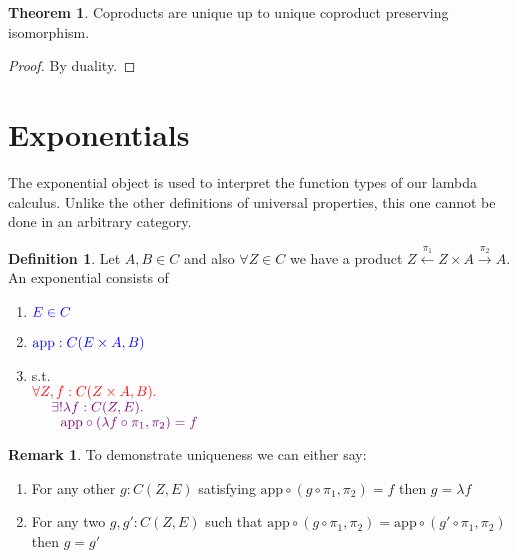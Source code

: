 \documentclass[12pt]{article}
\theoremstyle{definition}
\newtheorem{theorem}{Theorem}[section]
\newtheorem{remark}{Remark}[section]
\newtheorem{definition}{Definition}[section]
\newcommand{\app}{\mathrm{app}}
\newcommand{\purple}[1]{\textcolor{violet}{#1}}
\begin{document}
\begin{theorem}
    Coproducts are unique up to unique coproduct preserving isomorphism.
\end{theorem}
\begin{proof}
    By duality.
\end{proof}

\section{Exponentials}
The exponential object is used to interpret the function types of our lambda calculus. Unlike the other definitions of universal properties, this one cannot be done in an arbitrary category.

\begin{definition}
    Let $A,B \in C$ and also $\forall Z \in C$ we have a product $Z \xleftarrow{\pi_1} Z \times A \xrightarrow{\pi_2} A$. An exponential consists of
    \begin{enumerate}
        \item $\textcolor{blue}{E \in C}$
        \item $\textcolor{blue}{\app : C(E\times A , B)}$
        \item s.t. \\$\textcolor{red}{\forall Z,f:C(Z\times A,B).\;}$\\
        $\text{\quad}\ \purple{\exists!\lambda f:C(Z,E).}$\\
        $\text{\quad\quad}\purple{\app \circ(\lambda f \circ \pi_1, \pi_2)= f}$
    \end{enumerate}
\end{definition}

\begin{figure}[!h]
    \centering

\end{figure}

\begin{remark}
    To demonstrate uniqueness we can either say: 
    \begin{enumerate}
        \item For any other $g: C(Z,E)$ satisfying $\app \circ (g \circ \pi_1, \pi_2) = f$ then $g = \lambda f$
        \item For any two $g,g' : C(Z,E)$ such that $\app \circ (g \circ \pi_1,\pi_2) = \app \circ (g' \circ \pi_1, \pi_2)$ then $g = g'$
    \end{enumerate}
\end{remark}
\end{document}
